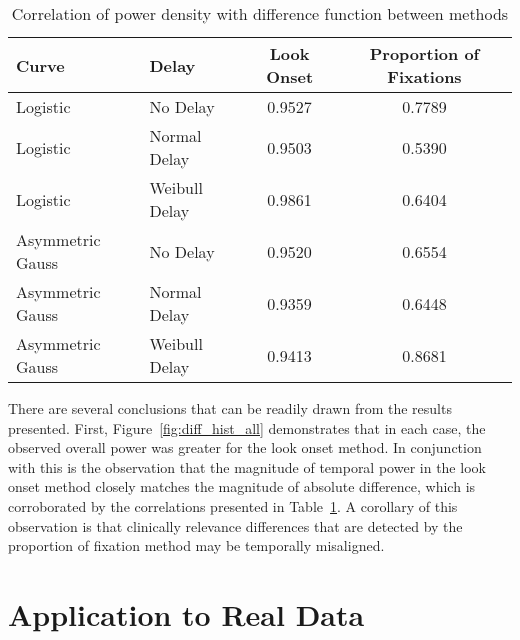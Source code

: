\begin{table}[H]
\centering
\begin{tabular}{llcc}
  \hline
Curve & Delay & Look Onset & Proportion of Fixations \\ 
  \hline
Logistic & No Delay & 0.9527 & 0.7789 \\ 
  Logistic & Normal Delay & 0.9503 & 0.5390 \\ 
  Logistic & Weibull Delay & 0.9861 & 0.6404 \\ 
  Asymmetric Gauss & No Delay & 0.9520 & 0.6554 \\ 
  Asymmetric Gauss & Normal Delay & 0.9359 & 0.6448 \\ 
  Asymmetric Gauss & Weibull Delay & 0.9413 & 0.8681 \\ 
   \hline
\end{tabular}
\caption{Correlation of power density with difference function between methods}
\label{tab:correlation_power}
\end{table}

There are several conclusions that can be readily drawn from the results presented. First, Figure~\ref{fig:diff_hist_all} demonstrates that in each case, the observed overall power was greater for the look onset method. In conjunction with this is the observation that the magnitude of temporal power in the look onset method closely matches the magnitude of absolute difference, which is corroborated by the correlations presented in Table~\ref{tab:correlation_power}. A corollary of this observation is that clinically relevance differences that are detected by the proportion of fixation method may be temporally misaligned. 




\section{Application to Real Data}

